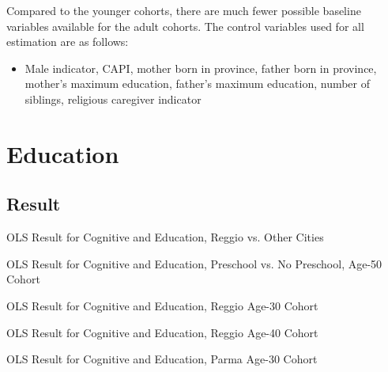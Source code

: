 Compared to the younger cohorts, there are much fewer possible baseline variables available for the adult cohorts. The control variables used for all estimation are as follows:
\begin{itemize}
\item Male indicator, CAPI, mother born in province, father born in province, mother's maximum education, father's maximum education, number of siblings, religious caregiver indicator
\end{itemize}


\section{Education}
\subsection{Result}
\begin{table}[H]
\begin{center}
	\caption{OLS Result for Cognitive and Education, Reggio vs. Other Cities} \label{tab:rvsother_E}
		
\end{center}
\end{table}

\begin{table}[H]
\begin{center}
	\caption{OLS Result for Cognitive and Education, Preschool vs. No Preschool, Age-50 Cohort} \label{tab:yesvsno50_E}
		
\end{center}
\end{table}


\begin{table}[H]
\begin{center}
	\caption{OLS Result for Cognitive and Education, Reggio Age-30 Cohort} \label{tab:reggio30_E}
		
\end{center}
\end{table}

\begin{table}[H]
\begin{center}
	\caption{OLS Result for Cognitive and Education, Reggio Age-40 Cohort} \label{tab:reggio40_E}
		
\end{center}
\end{table}


\begin{table}[H]
\begin{center}
	\caption{OLS Result for Cognitive and Education, Parma Age-30 Cohort} \label{tab:parma30_E}
		
\end{center}
\end{table}

